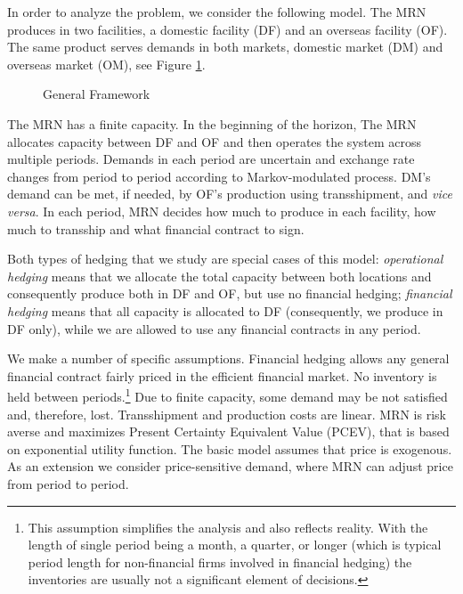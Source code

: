\documentclass[mnsc,nonblindrev,copyedit]{informs2_wz} %
\begin{document}


In order to analyze the problem, we consider the following model.  
The MRN produces in two facilities, a domestic facility (DF) and an overseas facility (OF).  The same product serves demands in both markets, domestic market (DM) and overseas market (OM),  see Figure \ref{figure:frameGeneral}.  
\begin{figure}[ht]
    \begin{center}
    \end{center}
    \caption{General Framework}\label{figure:frameGeneral}
\end{figure}

The MRN has a finite capacity.  In the beginning of the horizon, The MRN allocates capacity between DF and OF and then operates the system across multiple periods.  Demands in each period are uncertain and exchange rate changes from period to period according to Markov-modulated process. DM's demand can be met, if needed, by OF's production using transshipment, and {\it vice versa}.  In each period, MRN decides how much to produce in each facility, how much to transship and what financial contract to sign. 

Both types of hedging that we study are special cases of this model:  {\em operational hedging} means that we allocate the total capacity between both locations and consequently produce both in DF and OF, but use no financial hedging; {\em financial hedging} means that all capacity is allocated to DF (consequently, we produce in DF only), while we are allowed to use any financial contracts in any period.

We make a number of specific assumptions.  Financial hedging allows any general financial contract fairly priced in the efficient financial market. No inventory is held between periods.\footnote{This assumption simplifies the analysis and also reflects reality.  With the length of single period being a month, a quarter, or longer (which is typical period length for non-financial firms involved in financial hedging) the inventories are usually not a significant element of decisions.}  
Due to finite capacity, some demand may be not satisfied and, therefore, lost. Transshipment and production costs are linear.
MRN is risk averse and maximizes Present Certainty Equivalent Value (PCEV), that is based on exponential utility function.
The basic model assumes that price is exogenous.  As an extension we consider price-sensitive demand, where MRN can adjust price from period to period.
\end{document}
